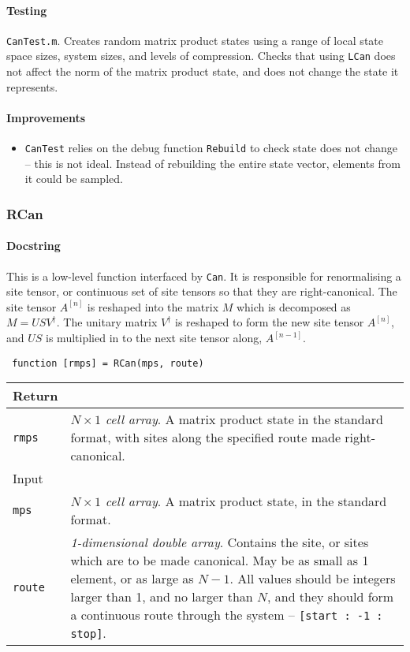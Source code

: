  \paragraph{Testing}
 \lstinline$CanTest.m$. Creates random matrix product states using a range of local state space sizes, system sizes, and levels of compression. Checks that using \lstinline$LCan$ does not affect the norm of the matrix product state, and does not change the state it represents.
 \paragraph{Improvements}
 \begin{itemize}
 \item \lstinline$CanTest$ relies on the debug function \lstinline$Rebuild$ to check state does not change -- this is not ideal. Instead of rebuilding the entire state vector, elements from it could be sampled.
 \end{itemize}

 \subsubsection{RCan}
 \paragraph{Docstring} This is a low-level function interfaced by \lstinline$Can$. It is responsible for renormalising a site tensor, or continuous set of site tensors so that they are right-canonical. The site tensor \(A^{[n]}\) is reshaped into the matrix \(M\) which is decomposed as \(M = USV^{\dagger}\). The unitary matrix \(V^{\dagger}\) is reshaped to form the new site tensor \(A^{[n]}\), and \(US\) is multiplied in to the next site tensor along, \(A^{[n-1]}\).
 \begin{lstlisting}
 function [rmps] = RCan(mps, route) \end{lstlisting}
 \begin{longtabu}{X[1,l]X[4,l]}
 \hline
 Return & \\ \hline
 \lstinline$rmps$ & \emph{\(N \times 1\) cell array}. A matrix product state in the standard format, with sites along the specified route made right-canonical. \\ \hline
 Input & \\ \hline
 \lstinline$mps$ & \emph{\(N \times 1\) cell array}. A matrix product state, in the standard format. \\
 \lstinline$route$ & \emph{1-dimensional double array}. Contains the site, or sites which are to be made canonical. May be as small as 1 element, or as large as \(N - 1\). All values should be integers larger than 1, and no larger than \(N\), and they should form a continuous route through the system -- \lstinline$[start : -1 : stop]$. \\
 \hline
 \end{longtabu}
